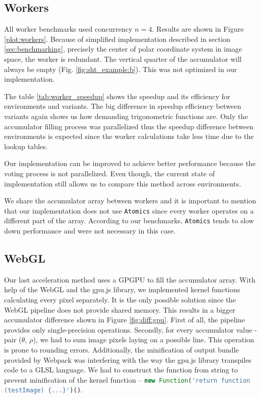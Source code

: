 

\subsection{Workers}

All worker benchmarks used concurrency $n=4$. Results are shown in Figure \ref{plot:workers}. Because of simplified implementation described in section \ref{sec:benchmarking}, precisely the center of polar coordinate system in image space, the  worker is redundant. The  vertical quarter of the accumulator will always be empty (Fig. \ref{fig:sht_example:b}). This was not optimized in our implementation.


The table \ref{tab:worker_speedup} shows the speedup and its efficiency for environments and variants. The big difference in speedup efficiency between variants again shows us how demanding trigonometric functions are. Only the accumulator filling process was parallelized thus the speedup difference between environments is expected since the worker calculations take less time due to the lookup tables.

 
Our implementation can be improved to achieve better performance because the voting process is not parallelized. Even though, the current state of implementation still allows us to compare this method across environments.


We share the accumulator array between workers and it is important to mention that our implementation does not use \texttt{Atomics} since every worker operates on a different part of the array. According to our benchmarks, \texttt{Atomics} tends to slow down performance and were not necessary in this case.



\subsection{WebGL}

Our last acceleration method uses a GPGPU to fill the accumulator array. With help of the WebGL and the gpu.js library, we implemented kernel functions calculating every pixel separately. It is the only possible solution since the WebGL pipeline does not provide shared memory. This results in a bigger accumulator difference shown in Figure \ref{fig:diff:gpu}. First of all, the pipeline provides only single-precision operations. Secondly, for every accumulator value - pair ($\theta$, $\rho$), we had to sum image pixels laying on a possible line. This operation is prone to rounding errors. Additionally, the minification of output bundle provided by Webpack was interfering with the way the gpu.js library transpiles code to a GLSL language. We had to construct the function from string to prevent minification of the kernel function -- \lstinline[language=JavaScript]|new Function('return function (testImage) {...}')()|.

